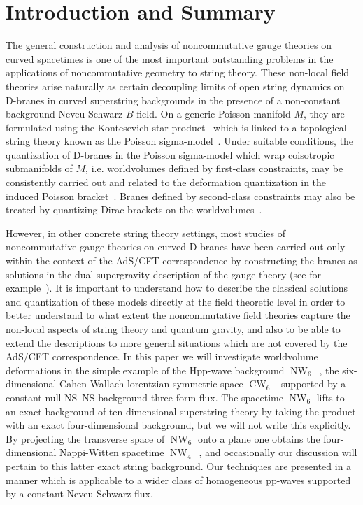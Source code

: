 \documentclass[11pt,a4paper]{article}
\DeclareMathOperator{\NW}{NW}
\DeclareMathOperator{\CW}{CW}
\newcommand{\1}{\mathbb{1}}
\renewcommand{\thefootnote}{\fnsymbol{footnote}}
\newcommand{\newsection}{\setcounter{equation}{0}\section}
\begin{document}
\newpage

\renewcommand{\thefootnote}{\arabic{footnote}} \setcounter{footnote}{0}

\newsection{Introduction and Summary\label{Intro}}

The general construction and analysis of noncommutative gauge theories
on curved spacetimes is one of the most important outstanding problems
in the applications of noncommutative geometry to string theory. These
non-local field theories arise naturally as certain decoupling limits
of open string dynamics on D-branes in curved superstring
backgrounds in the presence of a non-constant background Neveu-Schwarz
$B$-field. On a generic Poisson manifold $M$, they are formulated using
the Kontesevich star-product~\cite{Kont1} which is linked to a topological
string theory known as the Poisson sigma-model~\cite{CattFel1}. Under suitable
conditions, the quantization of D-branes in the Poisson sigma-model
which wrap coisotropic submanifolds of $M$, i.e. worldvolumes defined
by first-class constraints, may be consistently carried out and
related to the deformation quantization in the induced Poisson
bracket~\cite{CattFel2}. Branes defined by second-class constraints
may also be treated by quantizing Dirac brackets on the
worldvolumes~\cite{CFal1}.

However, in other concrete string theory settings, most studies of
noncommutative gauge theories on curved D-branes have been carried out
only within the context of the AdS/CFT correspondence by constructing
the branes as solutions in the dual supergravity description of the
gauge theory (see for example~\cite{Cai1,Cai2,HashSethi1,HashTh1,ASY1}). It is
important to understand how to describe the classical solutions and
quantization of these models directly at the field theoretic level in
order to better understand to what extent the noncommutative field
theories capture the non-local aspects of string theory and quantum
gravity, and also to be able to extend the descriptions to more
general situations which are not covered by the AdS/CFT
correspondence. In this paper we will investigate worldvolume
deformations in the simple example of the Hpp-wave background
$\NW_6$~\cite{Meessen1}, the six-dimensional Cahen-Wallach lorentzian
symmetric space $\CW_6$~\cite{CW1} supported by a constant null NS--NS
background three-form flux. The spacetime $\NW_6$ lifts to an exact
background of ten-dimensional superstring theory by taking the product
with an exact four-dimensional background, but we will not write this
explicitly. By projecting the transverse space of $\NW_6$ onto a plane
one obtains the four-dimensional Nappi-Witten spacetime
$\NW_4$~\cite{NW1}, and occasionally our discussion will pertain to
this latter exact string background. Our techniques are presented in a
manner which is applicable to a wider class of homogeneous pp-waves
supported by a constant Neveu-Schwarz flux.
\end{document}
